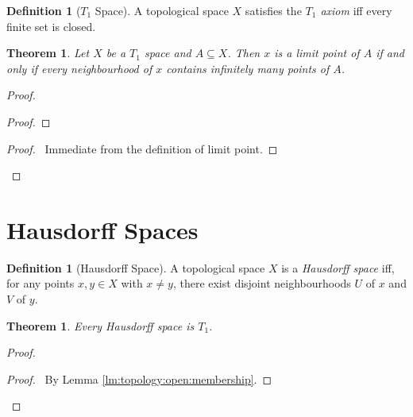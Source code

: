 \documentclass{book}
\newtheorem{thm}[lm]{Theorem}
\theoremstyle{definition}
\newtheorem{df}[lm]{Definition}
\begin{document}
  \begin{df}[$T_1$ Space]
    A topological space $X$ satisfies the \emph{$T_1$ axiom} iff every finite 
    set 
    is closed.
  \end{df}
  
  \begin{thm}
    Let $X$ be a $T_1$ space and $A \subseteq X$. Then $x$ is a limit point of 
    $A$ 
    if and only if every neighbourhood of $x$ contains infinitely many points 
    of 
    $A$.
  \end{thm}
  
  \begin{proof}
    \begin{proof}
    \end{proof}
    \begin{proof}
      \pf\ Immediate from the definition of limit point.
    \end{proof}
  \end{proof}
  
  \section{Hausdorff Spaces}
  
  \begin{df}[Hausdorff Space]
    A topological space $X$ is a \emph{Hausdorff space} iff, for any points $x, 
    y 
    \in X$ with $x \neq y$, there exist disjoint neighbourhoods $U$ of $x$ and 
    $V$ 
    of $y$.
  \end{df}
  
  \begin{thm}
    Every Hausdorff space is $T_1$.
  \end{thm}
  
  \begin{proof}
    \begin{proof}
      \pf\ By Lemma \ref{lm:topology:open:membership}.
    \end{proof}
  \end{proof}
  
\end{document}
